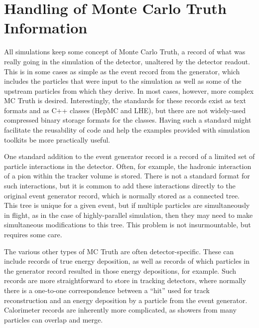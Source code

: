 \documentclass[12pt,a4paper]{article}
\begin{document}
\hypertarget{handling-of-monte-carlo-truth-information}{%
\section{Handling of Monte Carlo Truth
Information}\label{handling-of-monte-carlo-truth-information}}

All simulations keep some concept of Monte Carlo Truth, a record of what
was really going in the simulation of the detector, unaltered by the
detector readout. This is in some cases as simple as the event record
from the generator, which includes the particles that were input to the
simulation as well as some of the upstream particles from which they
derive. In most cases, however, more complex MC Truth is desired.
Interestingly, the standards for these records exist as text formats and
as C++ classes (HepMC and LHE), but there are not widely-used compressed
binary storage formats for the classes. Having such a standard might
facilitate the reusability of code and help the examples provided with
simulation toolkits be more practically useful.

One standard addition to the event generator record is a record of a
limited set of particle interactions in the detector. Often, for
example, the hadronic interaction of a pion within the tracker volume is
stored. There is not a standard format for such interactions, but it is
common to add these interactions directly to the original event
generator record, which is normally stored as a connected tree. This
tree is unique for a given event, but if multiple particles are
simultaneously in flight, as in the case of highly-parallel simulation,
then they may need to make simultaneous modifications to this tree. This
problem is not insurmountable, but requires some care.

The various other types of MC Truth are often detector-specific. These
can include records of true energy deposition, as well as records of
which particles in the generator record resulted in those energy
depositions, for example. Such records are more straightforward to store
in tracking detectors, where normally there is a one-to-one
correspondence between a ``hit'' used for track reconstruction and an
energy deposition by a particle from the event generator. Calorimeter
records are inherently more complicated, as showers from many particles
can overlap and merge.
\end{document}
